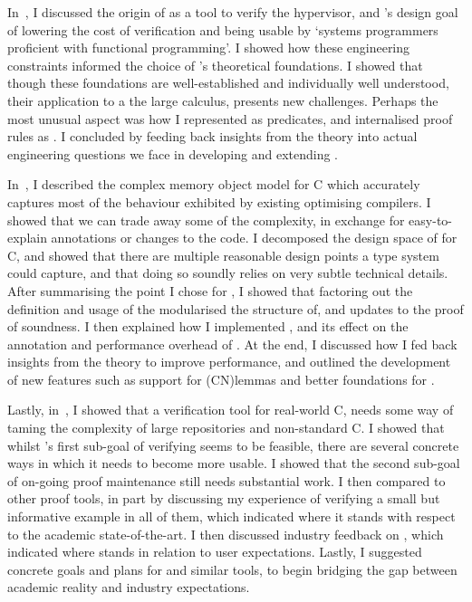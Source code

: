 In~, I discussed the origin of  as a tool to
verify the  hypervisor, and 's design goal of lowering the cost
of verification and being usable by `systems programmers proficient with
functional programming'. I showed how these engineering constraints informed
the choice of 's theoretical foundations. I showed that though these
foundations are well-established and individually well understood, their
application to a the large  calculus, presents new challenges.
Perhaps the most unusual aspect was how I represented  as
 predicates, and internalised proof rules as . I concluded by feeding back insights from the theory into actual
engineering questions we face in developing and extending .

In~, I described the complex  memory object
model for C which accurately captures most of the behaviour exhibited by
existing optimising compilers. I showed that we can trade away some of the
complexity, in exchange for easy-to-explain annotations or changes to the code.
I decomposed the design space of  for C, and showed
that there are multiple reasonable design
points a type system could capture, and that doing so soundly relies on
very subtle technical details. After summarising the point I chose for
, I showed that factoring out the definition and usage of the 
modularised the structure of, and updates to the proof of soundness.
I then explained how I implemented ,
and its effect on the annotation and performance overhead of .
At the end, I discussed how I fed back insights from the theory to improve performance,
and outlined the development of new features such as support for \kl(CN){lemmas} and
better foundations for .

Lastly, in~, I showed that a verification tool for
real-world C, needs some way of taming the complexity of large repositories and
non-standard C. I showed that whilst 's first sub-goal of verifying
 seems to be feasible, there are several concrete ways in which it
needs to become more usable. I showed that the second sub-goal of on-going
proof maintenance still needs substantial work. I then compared  to
other proof tools, in part by discussing my experience of verifying a small but
informative example in all of them, which indicated where it stands with
respect to the academic state-of-the-art. I then discussed industry feedback on
, which indicated where  stands in relation to user expectations.
Lastly, I suggested concrete goals and plans for  and similar tools, to
begin bridging the gap between academic reality and industry expectations.

